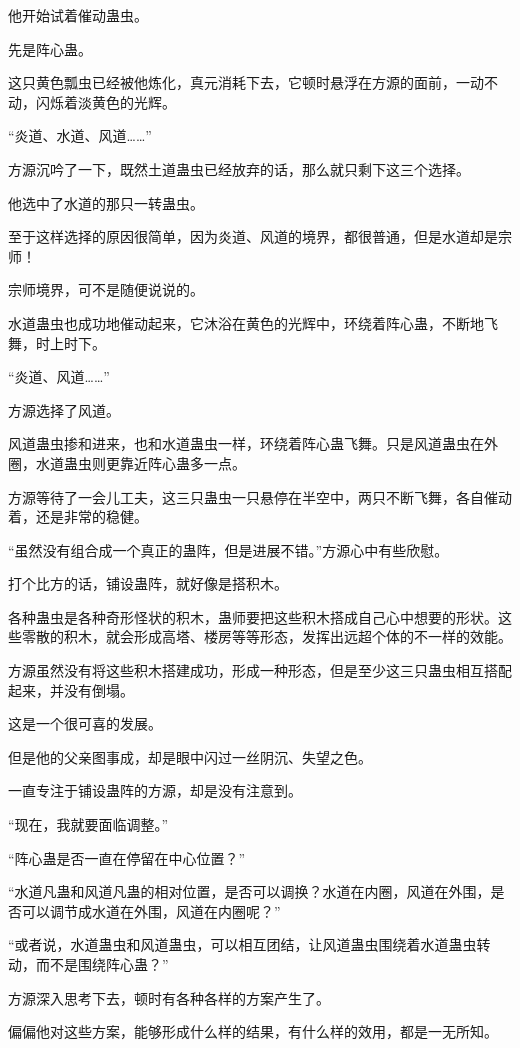 \begin{this_body}
他开始试着催动蛊虫。

先是阵心蛊。

这只黄色瓢虫已经被他炼化，真元消耗下去，它顿时悬浮在方源的面前，一动不动，闪烁着淡黄色的光辉。

“炎道、水道、风道……”

方源沉吟了一下，既然土道蛊虫已经放弃的话，那么就只剩下这三个选择。

他选中了水道的那只一转蛊虫。

至于这样选择的原因很简单，因为炎道、风道的境界，都很普通，但是水道却是宗师！

宗师境界，可不是随便说说的。

水道蛊虫也成功地催动起来，它沐浴在黄色的光辉中，环绕着阵心蛊，不断地飞舞，时上时下。

“炎道、风道……”

方源选择了风道。

风道蛊虫掺和进来，也和水道蛊虫一样，环绕着阵心蛊飞舞。只是风道蛊虫在外圈，水道蛊虫则更靠近阵心蛊多一点。

方源等待了一会儿工夫，这三只蛊虫一只悬停在半空中，两只不断飞舞，各自催动着，还是非常的稳健。

“虽然没有组合成一个真正的蛊阵，但是进展不错。”方源心中有些欣慰。

打个比方的话，铺设蛊阵，就好像是搭积木。

各种蛊虫是各种奇形怪状的积木，蛊师要把这些积木搭成自己心中想要的形状。这些零散的积木，就会形成高塔、楼房等等形态，发挥出远超个体的不一样的效能。

方源虽然没有将这些积木搭建成功，形成一种形态，但是至少这三只蛊虫相互搭配起来，并没有倒塌。

这是一个很可喜的发展。

但是他的父亲图事成，却是眼中闪过一丝阴沉、失望之色。

一直专注于铺设蛊阵的方源，却是没有注意到。

“现在，我就要面临调整。”

“阵心蛊是否一直在停留在中心位置？”

“水道凡蛊和风道凡蛊的相对位置，是否可以调换？水道在内圈，风道在外围，是否可以调节成水道在外围，风道在内圈呢？”

“或者说，水道蛊虫和风道蛊虫，可以相互团结，让风道蛊虫围绕着水道蛊虫转动，而不是围绕阵心蛊？”

方源深入思考下去，顿时有各种各样的方案产生了。

偏偏他对这些方案，能够形成什么样的结果，有什么样的效用，都是一无所知。


\end{this_body}
